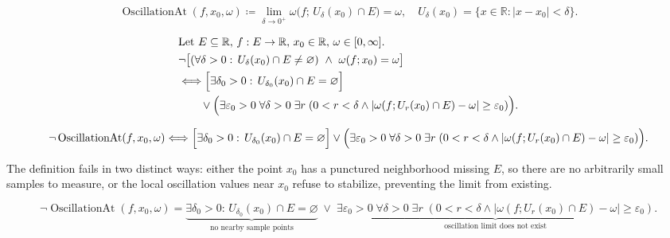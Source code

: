\begin{remark*}
\[
\operatorname{OscillationAt}(f,x_0,\omega) \coloneqq
\lim_{\delta \to 0^+} \omega\bigl(f;\,U_\delta(x_0)\cap E\bigr) = \omega,
\quad U_\delta(x_0)=\{x \in \mathbb{R}: |x-x_0|<\delta\}.
\]
\end{remark*}

\begin{remark*}
\[
\begin{aligned}
&\text{Let } E \subseteq \mathbb{R},\, f:E \to \mathbb{R},\, x_0 \in \mathbb{R},\, \omega \in [0,\infty].\\
&\neg\bigl[(\forall \delta>0:\, U_\delta(x_0)\cap E \neq \varnothing)\ \land\ \omega(f;x_0)=\omega\bigr]\\
&\Longleftrightarrow
\Bigl[\exists \delta_0>0:\, U_{\delta_0}(x_0)\cap E = \varnothing\Bigr]\\
&\qquad\lor
\Bigl(\exists \varepsilon_0>0\; \forall \delta>0\; \exists r\;(0<r<\delta \land |\omega(f;U_r(x_0)\cap E)-\omega| \ge \varepsilon_0)\Bigr).
\end{aligned}
\]
\end{remark*}

\begin{remark*}
\[
\neg\operatorname{OscillationAt}(f,x_0,\omega)
\Longleftrightarrow
\Bigl[\exists \delta_0>0:\, U_{\delta_0}(x_0)\cap E = \varnothing\Bigr]
\lor
\Bigl(\exists \varepsilon_0>0\; \forall \delta>0\; \exists r\;(0<r<\delta \land |\omega(f;U_r(x_0)\cap E)-\omega| \ge \varepsilon_0)\Bigr).
\]
\end{remark*}

\begin{remark*}
The definition fails in two distinct ways: either the point $x_0$ has a punctured neighborhood missing $E$, so there are no arbitrarily small samples to measure, or the local oscillation values near $x_0$ refuse to stabilize, preventing the limit from existing.
\end{remark*}

\begin{remark*}
\[
\neg\operatorname{OscillationAt}(f,x_0,\omega)
=
\underbrace{\exists \delta_0>0:\, U_{\delta_0}(x_0)\cap E = \varnothing}_{\text{no nearby sample points}}
\;\lor\;
\underbrace{\exists \varepsilon_0>0\; \forall \delta>0\; \exists r\;(0<r<\delta \land |\omega(f;U_r(x_0)\cap E)-\omega| \ge \varepsilon_0)}_{\text{oscillation limit does not exist}}.
\]
\end{remark*}

